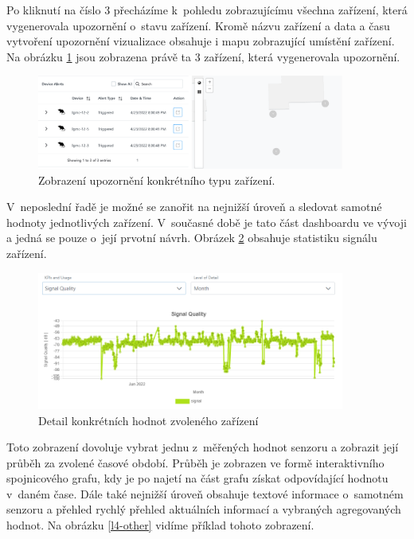 Po kliknutí na číslo 3 přecházíme k~pohledu zobrazujícímu všechna zařízení, která vygenerovala upozornění o~stavu zařízení. Kromě názvu zařízení a data a času vytvoření upozornění vizualizace obsahuje i mapu zobrazující umístění zařízení. Na obrázku \ref{l3} jsou zobrazena právě ta 3 zařízení, která vygenerovala upozornění.

\begin{figure}[H]
\label{l3}
\begin{center}
    \includegraphics[width=0.9\textwidth]{obrazky-figures/l3.pdf}
\end{center}
\caption{Zobrazení upozornění konkrétního typu zařízení.}
\end{figure}

V~neposlední řadě je možné se zanořit na nejnižší úroveň a sledovat samotné hodnoty jednotlivých zařízení. V~současné době je tato část dashboardu ve vývoji a jedná se pouze o~její prvotní návrh. Obrázek \ref{l4-statistics} obsahuje statistiku signálu zařízení.

\begin{figure}[H]
\label{l4-statistics}
\begin{center}
    \includegraphics[width=0.9\textwidth]{obrazky-figures/l4_stats.png}
\end{center}
\caption{Detail konkrétních hodnot zvoleného zařízení}
\end{figure}

Toto zobrazení dovoluje vybrat jednu z~měřených hodnot senzoru a zobrazit její průběh za zvolené časové období. Průběh je zobrazen ve formě interaktivního spojnicového grafu, kdy je po najetí na část grafu získat odpovídající hodnotu v~daném čase. Dále také nejnižší úroveň obsahuje textové informace o~samotném senzoru a přehled rychlý přehled aktuálních informací a vybraných agregovaných hodnot. Na obrázku \ref{l4-other} vidíme příklad tohoto zobrazení.

